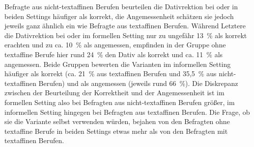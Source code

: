 Befragte aus nicht-textaffinen Berufen beurteilen die Dativrektion bei \wegen{} oder \waehrend{} in beiden Settings häufiger als korrekt, die Angemessenheit schätzen sie jedoch jeweils ganz ähnlich ein wie Befragte aus textaffinen Berufen. 
Während Letztere die Dativrektion bei \wegen{} oder \waehrend{} im formellen Setting nur zu ungefähr 13~\% als korrekt erachten und zu ca. 10~\% als angemessen, empfinden in der Gruppe ohne textaffine Berufe hier rund 24~\% den Dativ als korrekt und ca. 11~\% als angemessen. 
Beide Gruppen bewerten die Varianten im informellen Setting häufiger als korrekt (ca. 21~\% aus textaffinen Berufen und 35,5~\% aus nicht-textaffinen Berufen) und als angemessen (jeweils rund 66~\%). 
Die Diskrepanz zwischen der Beurteilung der Korrektheit und der Angemessenheit ist im formellen Setting also bei Befragten aus nicht-textaffinen Berufen größer, im informellen Setting hingegen bei Befragten aus textaffinen Berufen. 
Die Frage, ob sie die Variante selbst verwenden würden, bejahen von den Befragten ohne textaffine Berufe in beiden Settings etwas mehr als von den Befragten mit textaffinen Berufen. 

